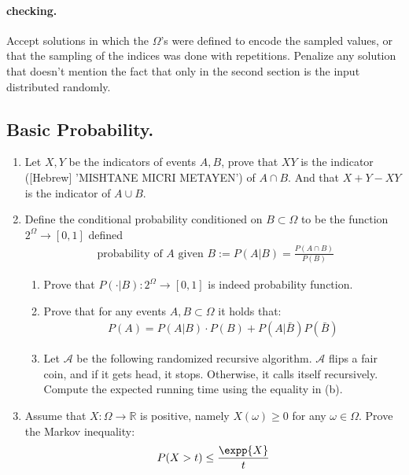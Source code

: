 \ifdefined\CHECK
  \paragraph{checking.} Accept solutions in which the $\Omega$'s were defined to encode the sampled values, or that the sampling of the indices was done with repetitions. Penalize any solution that doesn't mention the fact that only in the second section is the input distributed randomly.
\fi 

\subsection{Basic Probability.} 
\begin{enumerate}

  \item {} Let $X,Y$ be the indicators of events $A,B$, prove that $ XY$ is the indicator ([Hebrew] 'MISHTANE MICRI METAYEN') of $A \cap B$. And that $X + Y - XY$ is the indicator of $ A\cup B$.  
\item {} Define the conditional probability conditioned on $B \subset \Omega$ to be the function $2^{\Omega} \rightarrow [0,1]$ defined   
  \begin{equation*}
    \begin{split}
      \text{ probability of } A \text { given } B := P(A | B) = \frac{P(A\cap B)}{P(B)} 
    \end{split}
  \end{equation*}
  \begin{enumerate}
    \item Prove that $P( \cdot | B) : 2^{\Omega} \rightarrow [0,1]$ is indeed probability function. 
    \item Prove that for any events $A,B \subset \Omega$ it holds that:
      \begin{equation*}
        \begin{split}
          P(A) = P(A | B)\cdot P(B) + P(A | \bar{B})P(\bar{B})
        \end{split}
      \end{equation*}
    \item Let $\mathcal{A}$ be the following randomized recursive algorithm. $\mathcal{A}$ flips a fair coin, and if it gets head, it stops. Otherwise, it calls itself recursively. Compute the expected running time using the equality in (b).
  \end{enumerate}
\item Assume that $X: \Omega \rightarrow \mathbb{R}$ is positive, namely $X(\omega) \ge 0 $ for any $\omega \in \Omega$. Prove the Markov inequality: 
\begin{equation*}
  \begin{split}
    P(X > t) \le \frac{\expp{X}}{t}
  \end{split}
\end{equation*} 
\ifdefined\SOLUTION

\end{enumerate}
